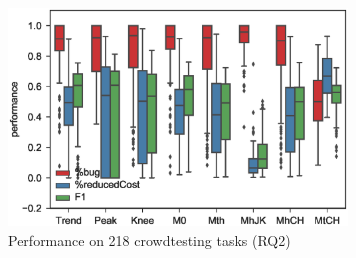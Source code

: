 \begin{figure}[t!]
\centering
\includegraphics[width=9cm]{figure/effective.eps}
\caption{Performance on 218 crowdtesting tasks (RQ2)}
\label{fig:effective}
\end{figure}

